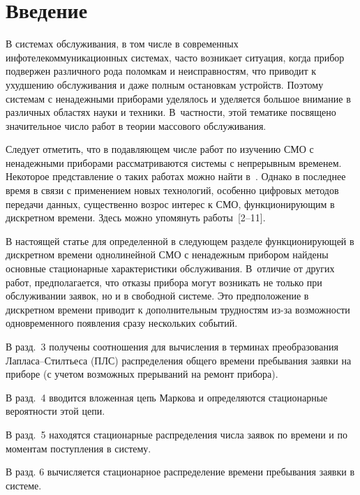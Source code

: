       \begin{multicols}{2}

            \label{st\stat}


\section{Введение}

В системах обслуживания, в том числе в современных
инфотелекоммуникационных сис\-те\-мах, часто возникает ситуация,
когда прибор подвержен различного рода поломкам и неисправностям, что
приводит к ухудшению обслуживания и даже полным остановкам устройств.
Поэтому сис\-те\-мам с ненадежными приборами уделялось и уделяется
большое внимание в различных областях науки и техники.
В~част\-ности, этой тематике посвящено значительное число работ в
теории массового обслуживания.

Следует отметить, что в подавляющем числе работ по изучению
СМО с ненадежными приборами
рассматриваются сис\-те\-мы с непрерывным временем.
Некоторое представление о таких работах можно найти в~\cite{P.S.Ch}.
Однако в последнее время в связи с применением новых технологий,
особенно цифровых методов передачи данных, существенно возрос
интерес к СМО, функционирующим в дискретном времени.
Здесь можно упомянуть работы~[2--11].

В настоящей статье для определенной в сле\-ду\-ющем разделе
функционирующей в дискретном времени однолинейной СМО с
ненадежным прибором найдены основные стационарные
характеристики обслуживания.
В~отличие от других работ, предполагается, что отказы прибора
могут возникать не только при обслуживании заявок, но и
в свободной сис\-теме.
Это предположение в дискретном времени приводит к дополнительным
трудностям из-за возможности одновременного появления сразу
нескольких событий.

В разд.~3 получены соотношения для вычисления в терминах
преобразования Лап\-ла\-са--Стилть\-е\-са (ПЛС) распределения
общего времени пребывания заявки на приборе (с учетом
возможных прерываний на ремонт прибора).

В разд.~4 вводится вложенная цепь Маркова и определяются
стационарные вероятности этой \mbox{цепи}.

В разд.~5 находятся стационарные распределения чис\-ла
заявок по времени и по моментам поступления в сис\-тему.

В разд. 6 вычисляется стационарное распределение
времени пребывания заявки в сис\-теме.


\end{multicols}
